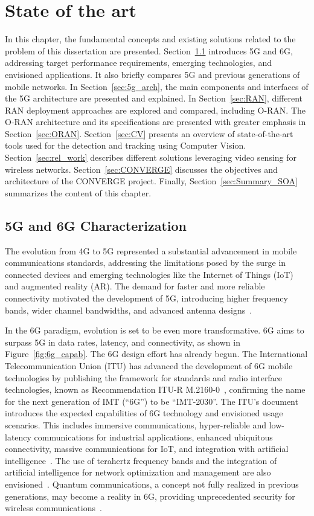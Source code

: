 \chapter{State of the art}\label{ch:state-of-the-art}

In this chapter, the fundamental concepts and existing solutions related to the problem of
this dissertation are presented.
Section~\ref{sec:6g_charac} introduces 5G and 6G, addressing target performance requirements, emerging technologies, and envisioned applications.
It also briefly compares 5G and previous generations of mobile networks.
In Section~\ref{sec:5g_arch}, the main components and interfaces of the 5G architecture are presented and explained.
In Section~\ref{sec:RAN}, different RAN deployment approaches are explored and compared, including O-RAN. The O-RAN architecture and its specifications are presented with greater emphasis in Section~\ref{sec:ORAN}.
Section~\ref{sec:CV} presents an overview of state-of-the-art tools used for the detection and tracking using Computer Vision.
Section~\ref{sec:rel_work} describes different solutions leveraging video sensing for wireless networks.
Section~\ref{sec:CONVERGE} discusses the objectives and architecture of the CONVERGE project.
Finally, Section~\ref{sec:Summary_SOA} summarizes the content of this chapter.

\section{5G and 6G Characterization} \label{sec:6g_charac}
The evolution from 4G to 5G represented a substantial advancement in mobile communications standards, addressing the limitations posed by the surge in connected devices and emerging technologies like the Internet of Things (IoT) and augmented reality (AR). The demand for faster and more reliable connectivity motivated the development of 5G, introducing higher frequency bands, wider channel bandwidths, and advanced antenna designs~\cite{5G_apps}.

In the 6G paradigm, evolution is set to be even more transformative.
6G aims to surpass 5G in data rates, latency, and connectivity, as shown in Figure~\ref{fig:6g_capab}.
The 6G design effort has already begun.
The International Telecommunication Union (ITU) has advanced the development of 6G mobile technologies by publishing the framework for standards and radio interface technologies, known as Recommendation ITU-R M.2160-0~\cite{ITU_2160-0}, confirming the name for the next generation of IMT (“6G”) to be “IMT-2030”.
The ITU's document introduces the expected capabilities of 6G technology and envisioned usage scenarios.
This includes immersive communications, hyper-reliable and low-latency communications for industrial applications, enhanced ubiquitous connectivity, massive communications for IoT, and integration with artificial intelligence~\cite{6G_ITU}.
The use of terahertz frequency bands and the integration of artificial intelligence for network optimization and management are also envisioned~\cite{6G_ITU}.
Quantum communications, a concept not fully realized in previous generations, may become a reality in 6G, providing unprecedented security for wireless communications~\cite{6G_ITU}.

